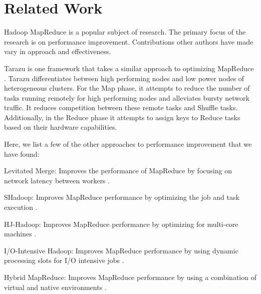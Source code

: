 \section{Related Work}
\label{section:relatedwork}
Hadoop MapReduce is a popular subject of research. The primary focus of the research
is on performance improvement. Contributions other authors have made vary in
approach and effectiveness.

Tarazu is one framework that takes a similar approach to optimizing MapReduce \cite{Tarazu}. Tarazu
differentiates between high performing nodes and low power nodes of heterogeneous clusters.
For the Map phase, it attempts to reduce the number of tasks running remotely for high
performing nodes and alleviates bursty network traffic. It reduces competition between
these remote tasks and Shuffle tasks. Additionally, in the Reduce phase it attempts to
assign keys to Reduce tasks based on their hardware capabilities.

Here, we list a few of the other approaches to performance improvement that we have found:
\begin{description}
  \item{Levitated Merge:} Improves the performance of MapReduce by focusing on network latency between workers \cite{LevitatedMerge}.
  \item{SHadoop:} Improves MapReduce performance by optimizing the job and task execution \cite{SHadoop}.
  \item{HJ-Hadoop:} Improves MapReduce performance by optimizing for multi-core machines \cite{HJHadoop}.
  \item{I/O-Intensive Hadoop:} Improves MapReduce performance by using dynamic processing slots for I/O intensive jobs \cite{IOIntensiveHadoop}.
  \item{Hybrid MapReduce:} Improves MapReduce performance by using a combination of virtual and native environments \cite{HybridMR}.
\end{description}
